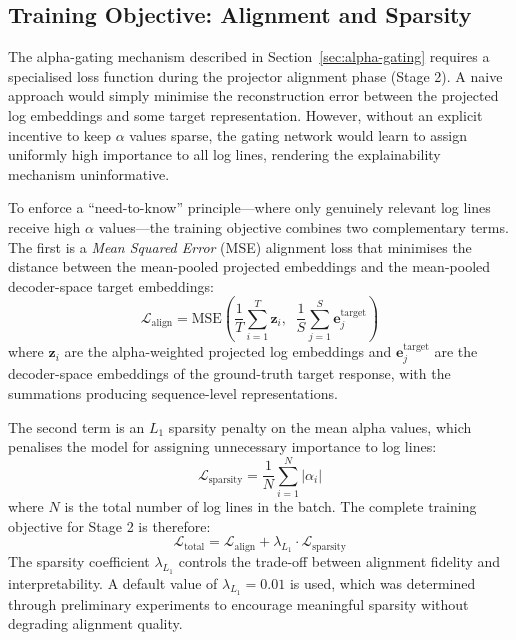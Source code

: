 \subsection{Training Objective: Alignment and Sparsity}\label{sec:training-objective}

The alpha-gating mechanism described in Section~\ref{sec:alpha-gating} requires a specialised loss function during the projector alignment phase (Stage 2). A naive approach would simply minimise the reconstruction error between the projected log embeddings and some target representation. However, without an explicit incentive to keep $\alpha$ values sparse, the gating network would learn to assign uniformly high importance to all log lines, rendering the explainability mechanism uninformative.

To enforce a ``need-to-know'' principle---where only genuinely relevant log lines receive high $\alpha$ values---the training objective combines two complementary terms. The first is a \textit{Mean Squared Error} (MSE) alignment loss that minimises the distance between the mean-pooled projected embeddings and the mean-pooled decoder-space target embeddings:
\begin{equation}\label{eq:mse-loss}
    \mathcal{L}_{\text{align}} = \text{MSE}\!\left( \frac{1}{T}\sum_{i=1}^{T} \mathbf{z}_i, \;\; \frac{1}{S}\sum_{j=1}^{S} \mathbf{e}_j^{\text{target}} \right)
\end{equation}
where $\mathbf{z}_i$ are the alpha-weighted projected log embeddings and $\mathbf{e}_j^{\text{target}}$ are the decoder-space embeddings of the ground-truth target response, with the summations producing sequence-level representations.

The second term is an $L_1$ sparsity penalty on the mean alpha values, which penalises the model for assigning unnecessary importance to log lines:
\begin{equation}\label{eq:l1-loss}
    \mathcal{L}_{\text{sparsity}} = \frac{1}{N} \sum_{i=1}^{N} |\alpha_i|
\end{equation}
where $N$ is the total number of log lines in the batch. The complete training objective for Stage 2 is therefore:
\begin{equation}\label{eq:total-loss}
    \mathcal{L}_{\text{total}} = \mathcal{L}_{\text{align}} + \lambda_{L_1} \cdot \mathcal{L}_{\text{sparsity}}
\end{equation}
The sparsity coefficient $\lambda_{L_1}$ controls the trade-off between alignment fidelity and interpretability. A default value of $\lambda_{L_1} = 0.01$ is used, which was determined through preliminary experiments to encourage meaningful sparsity without degrading alignment quality.

